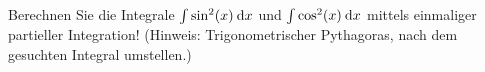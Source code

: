 \item Berechnen Sie die Integrale $\int \sin^2(x) \:\mathrm{d}{x}$ und $\int \cos^2(x) \:\mathrm{d}{x}$ mittels einmaliger partieller Integration! (Hinweis: Trigonometrischer Pythagoras, nach dem gesuchten Integral umstellen.)